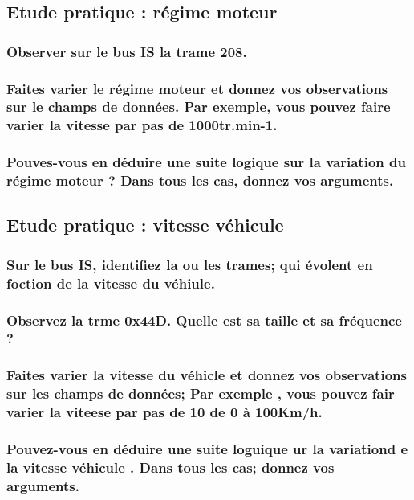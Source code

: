 \documentclass{rapportECC}
\begin{document}
\subsection{Etude pratique : régime moteur}

\subsubsection*{Observer sur le bus IS la trame 208.}

\subsubsection*{Faites varier le régime moteur et donnez vos observations sur le champs de données. Par exemple, vous pouvez faire varier la vitesse par pas de 1000tr.min\uppercase{-1}.}

\subsubsection*{Pouves-vous en déduire une suite logique sur la variation du régime moteur ? Dans tous les cas, donnez vos arguments.}

\subsection{Etude pratique : vitesse véhicule}

\subsubsection*{Sur le bus IS, identifiez la ou les trames; qui évolent en foction de la vitesse du véhiule.}
\subsubsection*{Observez la trme 0x44D. Quelle est sa taille et sa fréquence ?}
\subsubsection*{Faites varier la vitesse du véhicle et donnez vos observations sur les champs de données; Par exemple , vous pouvez fair varier la viteese par pas de 10 de 0 à 100Km/h.}
\subsubsection*{Pouvez-vous en déduire une suite loguique ur la variationd e la vitesse véhicule . Dans tous les cas; donnez vos arguments.}
\end{document}
